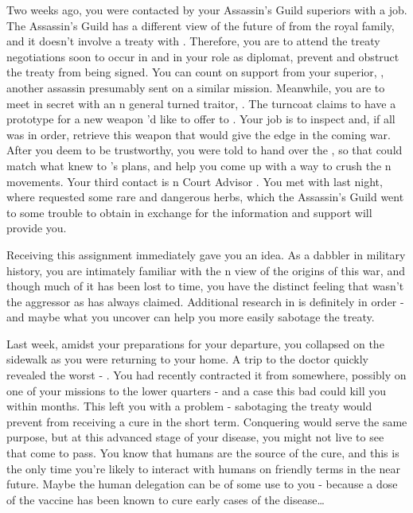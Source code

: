 \documentclass[char]{NeptuneBall}
\begin{document}
Two weeks ago, you were contacted by your Assassin's Guild superiors with a job. The Assassin's Guild has a different view of the future of \pPacifica{} from the royal family, and it doesn't involve a treaty with \pAtlantis{}. Therefore, you are to attend the treaty negotiations soon to occur in \pAtlantis{} and in your role as diplomat, prevent and obstruct the treaty from being signed. You can count on support from your superior, \cDiplomat{}, another assassin presumably sent on a similar mission. Meanwhile, you are to meet in secret with an \pAtlantis{}n general turned traitor, \cGeneral{}. The turncoat claims to have a prototype for a new weapon \cGeneral{\they}'d like to offer to \pPacifica{}. Your job is to inspect and, if all was in order, retrieve this weapon that would give \pPacifica{} the edge in the coming war. After you deem \cGeneral{\them} to be trustworthy, you were told to hand over the \iBattlePlan{}, so that \cGeneral{\they} could match what \cGeneral{\they} knew to \pPacifica{}'s plans, and help you come up with a way to crush the \pAtlantis{}n movements. Your third contact is \pAtlantis{}n Court Advisor \cManta{}.  You met with \cManta{\them} last night, where \cManta{\they} requested some rare and dangerous herbs, which the Assassin's Guild went to some trouble to obtain in exchange for the information and support \cManta{} will provide you.

Receiving this assignment immediately gave you an idea. As a dabbler in military history, you are intimately familiar with the \pPacifica{}n view of the origins of this war, and though much of it has been lost to time, you have the distinct feeling that \pPacifica{} wasn't the aggressor as \pAtlantis{} has always claimed. Additional research in \pAtlantis{} is definitely in order - and maybe what you uncover can help you more easily sabotage the treaty. 

Last week, amidst your preparations for your departure, you collapsed on the sidewalk as you were returning to your home. A trip to the doctor quickly revealed the worst - \pPolio{}. You had recently contracted it from somewhere, possibly on one of your missions to the lower quarters - and a case this bad could kill you within months. This left you with a problem - sabotaging the treaty would prevent \pPacifica{} from receiving a cure in the short term. Conquering \pAtlantis{} would serve the same purpose, but at this advanced stage of your disease, you might not live to see that come to pass. You know that humans are the source of the cure, and this is the only time you're likely to interact with humans on friendly terms in the near future. Maybe the human delegation can be of some use to you - because a dose of the vaccine has been known to cure early cases of the disease\dots
\end{document}

